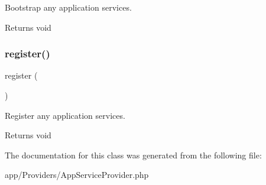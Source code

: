 Bootstrap any application services.

\begin{DoxyReturn}{Returns}
void 
\end{DoxyReturn}
\mbox{\label{class_app_1_1_providers_1_1_app_service_provider_acc294a6cc8e69743746820e3d15e3f78}} 
\subsubsection{\texorpdfstring{register()}{register()}}
{\footnotesize\ttfamily register (\begin{DoxyParamCaption}{ }\end{DoxyParamCaption})}

Register any application services.

\begin{DoxyReturn}{Returns}
void 
\end{DoxyReturn}


The documentation for this class was generated from the following file\+:\begin{DoxyCompactItemize}
\item 
app/\+Providers/App\+Service\+Provider.\+php\end{DoxyCompactItemize}
